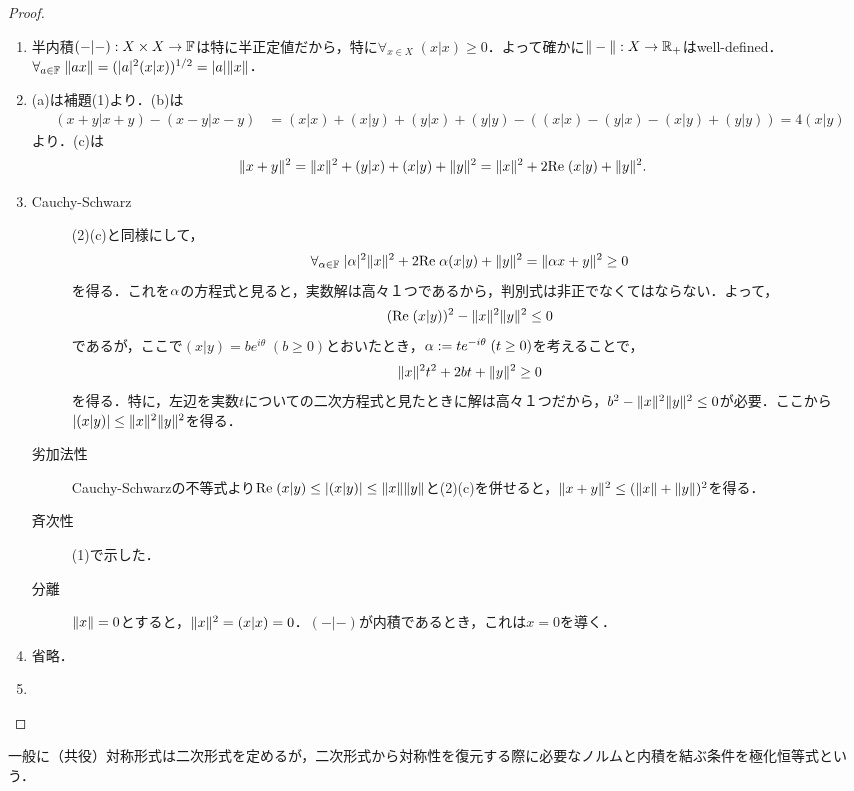 \documentclass[uplatex,dvipdfmx]{jsreport}
\begin{document}
\begin{proof}\mbox{}
    \begin{enumerate}
        \item 半内積$(-|-):X\times X\to\mathbb{F}$は特に半正定値だから，特に$\forall_{x\in X}\;(x|x)\ge 0$．よって確かに$\|-\|:X\to\mathbb{R}_+$はwell-defined．
        $\forall_{a\in\mathbb{F}}\;\|ax\|=(\lvert a\rvert^2(x|x))^{1/2}=\lvert a\rvert\|x\|$．
        \item (a)は補題(1)より．(b)は
        \begin{align*}
            (x+y|x+y)-(x-y|x-y)&=(x|x)+(x|y)+(y|x)+(y|y)-((x|x)-(y|x)-(x|y)+(y|y))=4(x|y)
        \end{align*}
        より．(c)は
        \begin{align*}
            \|x+y\|^2&=\|x\|^2+(y|x)+(x|y)+\|y\|^2=\|x\|^2+2\mathrm{Re}\;(x|y)+\|y\|^2.
        \end{align*}
        \item 
        \begin{description}
            \item[Cauchy-Schwarz] 
        (2)(c)と同様にして，
        \[\forall_{\alpha\in\mathbb{F}}\;\lvert\alpha\rvert^2\|x\|^2+2\mathrm{Re}\;\alpha(x|y)+\|y\|^2=\|\alpha x+y\|^2\ge 0\]
        を得る．これを$\alpha$の方程式と見ると，実数解は高々１つであるから，判別式は非正でなくてはならない．よって，
        \[(\mathrm{Re}\;(x|y))^2-\|x\|^2\|y\|^2\le 0\]
        であるが，ここで$(x|y)=be^{i\theta}\;(b\ge 0)$とおいたとき，$\alpha:=te^{-i\theta}\;(t\ge0)$を考えることで，
        \[\|x\|^2t^2+2bt+\|y\|^2\ge0\]
        を得る．特に，左辺を実数$t$についての二次方程式と見たときに解は高々１つだから，$b^2-\|x\|^2\|y\|^2\le 0$が必要．ここから$\lvert(x|y)\rvert\le\|x\|^2\|y\|^2$を得る．
            \item[劣加法性] Cauchy-Schwarzの不等式より$\mathrm{Re}\;(x|y)\le\lvert(x|y)\rvert\le\|x\|\|y\|$と(2)(c)を併せると，$\|x+y\|^2\le(\|x\|+\|y\|)^2$を得る．
            \item[斉次性] (1)で示した．
            \item[分離] $\|x\|=0$とすると，$\|x\|^2=(x|x)=0$．$(-|-)$が内積であるとき，これは$x=0$を導く．
        \end{description}
        \item 省略．
        \item 
    \end{enumerate}
\end{proof}
\begin{remarks}
    一般に（共役）対称形式は二次形式を定めるが，二次形式から対称性を復元する際に必要なノルムと内積を結ぶ条件を極化恒等式という．
\end{remarks}
\end{document}
